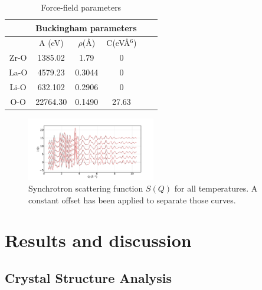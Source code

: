 \documentclass[twoside,twocolumn,9pt]{article}
\begin{document}
\begin{table}[h]
\centering
\caption{Force-field parameters} \label{tab:md_force}
\begin{tabular}{cccccc}
\hline
      & \multicolumn{3}{c}{Buckingham parameters}      \\
\hline
      & A (eV)  & $\rho$(\AA) & C(eV\AA$^6$)           \\
Zr-O  & 1385.02 & 1.79        & 0                      \\
La-O  & 4579.23 & 0.3044      & 0                      \\
Li-O  & 632.102 & 0.2906      & 0                      \\
O-O   & 22764.30& 0.1490      & 27.63                  \\
\hline
\end{tabular}
\end{table}

\begin{figure}
\centering
\includegraphics[width=0.5\textwidth]{Pics/xsoq.pdf}
\caption{Synchrotron scattering function $S(Q)$ for all temperatures. A constant offset has been applied to separate those curves.}
\label{fig:xsoq}
\end{figure}




%


\section{Results and discussion}
\subsection{Crystal Structure Analysis}
\end{document}
